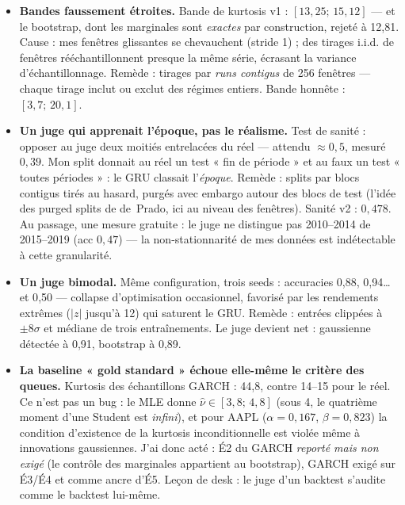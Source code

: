 \documentclass[11pt,a4paper]{article}
\begin{document}
\begin{itemize}[itemsep=3pt]
  \item \textbf{Bandes faussement étroites.} Bande de kurtosis v1 : $[13{,}25;\,
        15{,}12]$ --- et le bootstrap, dont les marginales sont \emph{exactes} par
        construction, rejeté à 12{,}81. Cause : mes fenêtres glissantes se chevauchent
        (stride 1) ; des tirages i.i.d. de fenêtres rééchantillonnent presque la même
        série, écrasant la variance d'échantillonnage. Remède : tirages par \emph{runs
        contigus} de 256 fenêtres --- chaque tirage inclut ou exclut des régimes
        entiers. Bande honnête : $[3{,}7;\, 20{,}1]$.
  \item \textbf{Un juge qui apprenait l'époque, pas le réalisme.} Test de sanité :
        opposer au juge deux moitiés entrelacées du réel --- attendu $\approx 0{,}5$,
        mesuré $0{,}39$. Mon split donnait au réel un test « fin de période » et au
        faux un test « toutes périodes » : le GRU classait l'\emph{époque}. Remède :
        splits par blocs contigus tirés au hasard, purgés avec embargo autour des blocs
        de test (l'idée des purged splits de de~Prado, ici au niveau des fenêtres).
        Sanité v2 : $0{,}478$. Au passage, une mesure gratuite : le juge ne distingue
        pas 2010--2014 de 2015--2019 (acc $0{,}47$) --- la non-stationnarité de mes
        données est indétectable à cette granularité.
  \item \textbf{Un juge bimodal.} Même configuration, trois seeds : accuracies 0{,}88,
        0{,}94\ldots{} et 0{,}50 --- collapse d'optimisation occasionnel, favorisé par
        les rendements extrêmes ($|z|$ jusqu'à 12) qui saturent le GRU. Remède : entrées
        clippées à $\pm 8\sigma$ et médiane de trois entraînements. Le juge devient
        net : gaussienne détectée à 0{,}91, bootstrap à 0{,}89.
  \item \textbf{La baseline « gold standard » échoue elle-même le critère des
        queues.} Kurtosis des échantillons GARCH : 44{,}8, contre 14--15 pour le réel.
        Ce n'est pas un bug : le MLE donne $\hat{\nu} \in [3{,}8;\,4{,}8]$ (sous 4, le
        quatrième moment d'une Student est \emph{infini}), et pour AAPL
        ($\alpha=0{,}167$, $\beta=0{,}823$) la condition d'existence de la kurtosis
        inconditionnelle est violée même à innovations gaussiennes. J'ai donc acté :
        É2 du GARCH \emph{reporté mais non exigé} (le contrôle des marginales
        appartient au bootstrap), GARCH exigé sur É3/É4 et comme ancre d'É5. Leçon de
        desk : le juge d'un backtest s'audite comme le backtest lui-même.
\end{itemize}
\end{document}
